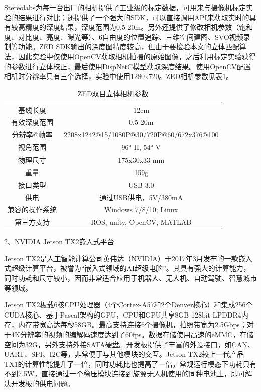 Stereolabs为每一台出厂的相机提供了工业级的标定数据，可用来与摄像机标定实验的结果进行对比；还提供了一个强大的SDK，可以直接调用API来获取实时的具有较高精度的深度结果，深度范围为0.5-20m。另外还提供了修改相机参数（饱和度、对比度、亮度、曝光等）、6自由度的位置追踪、三维空间建图、SVO视频录制等功能。ZED SDK输出的深度图精度较高，但由于要检验本文的立体匹配算法，因此实验中仅使用OpenCV获取相机拍摄的原始图像，之后利用标定实验获得的参数进行立体校正，最后使用DispNetC模型获取深度结果。使用OpenCV配置相机时分辨率只有三个选择，实验中使用1280x720。ZED相机参数见表\ref{tab:5_ZED}。

\begin{table}[htb] %
	\centering
	\caption{ZED双目立体相机参数}
	\label{tab:5_ZED}
	\begin{small}
	\begin{tabular}{|c|c|}\hline
		基线长度 & 12cm \\
		有效深度范围   & 0.5-20m \\
		分辨率@帧率 & 2208x1242@15/1080P@30/720P@60/672x376@100 \\
		视角范围 & 96° H, 54° V \\
		物理尺寸 & 175x30x33 mm \\
		重量 & 159g \\
		接口类型 & USB 3.0 \\
		供电 & 通过USB供电，5V/380mA \\
		兼容的操作系统 & Windows 7/8/10; Linux \\
		第三方支持 & ROS, unity, OpenCV, MATLAB \\\hline
	\end{tabular}
	\end{small}
\end{table}

2、NVIDIA Jetson TX2嵌入式平台

Jetson TX2是人工智能计算公司英伟达（NVIDIA）于2017年3月发布的一款嵌入式超级计算平台，被誉为“嵌入式领域的AI超级电脑”。其具有强大的计算能力，同时功耗和尺寸较小，因而非常适合应用于机器人、无人机、自动驾驶、智慧城市等领域。

Jetson TX2板载6核CPU处理器（4个Cortex-A57和2个Denver核心）和集成256个CUDA核心、基于Pascal架构的GPU，CPU和GPU共享8GB 128bit LPDDR4内存，内存带宽高达每秒58GB。最高支持连接6个摄像机，拍照带宽为2.5Gbps；对于4K分辨率的视频的编解码速度达到了60fps。数据存储使用高速的eMMC，存储空间为32G，另外支持外接SATA硬盘。开发板提供了丰富的外设接口，如CAN、UART、SPI、I2C等，非常便于与其他模块的交互。Jetson TX2较上一代产品TX1的计算性能提升了一倍，同时功耗比也提高了一倍，常规运行模态下功耗只有不到7.5W，直接通过一个稳压模块连接到旋翼无人机使用的同种电池上，即可解决开发板的供电问题。

